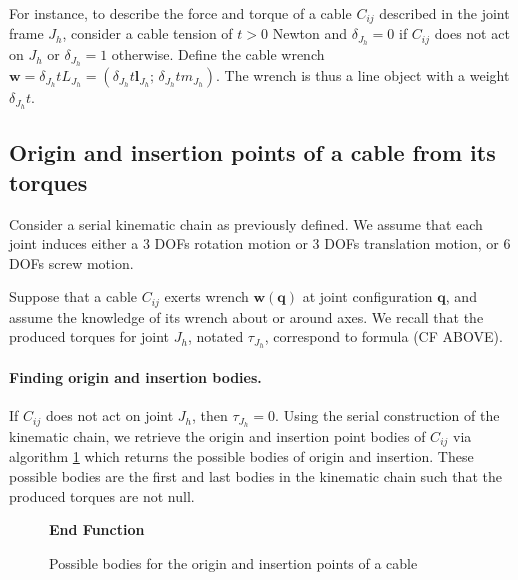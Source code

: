For instance, to describe the force and torque of a cable $C_{ij}$ described in the joint frame $J_h$, consider a cable tension of $t>0$ Newton and $\delta_{J_h} = 0$ if $C_{ij}$ does not act on $J_h$ or $\delta_{J_h} = 1$ otherwise.
Define the cable wrench $\mathbf{w} = \delta_{J_h} t L_{J_h} = (\delta_{J_h} t\mathbf{l}_{J_h};\, \delta_{J_h} t m_{J_h})$. The wrench is thus a line object with a weight $\delta_{J_h} t$.

\subsection{Origin and insertion points of a cable from its torques}
Consider a serial kinematic chain as previously defined. We assume that each joint induces either a 3 DOFs rotation motion or 3 DOFs translation motion, or 6 DOFs screw motion.

Suppose that a cable $C_{ij}$ exerts wrench $\mathbf{w}(\mathbf{q})$ at joint configuration $\mathbf{q}$, and assume the knowledge of its wrench about or around axes. We recall that the produced torques for joint $J_h$, notated $\tau_{J_h}$, correspond to formula (CF ABOVE).

\paragraph*{Finding origin and insertion bodies.}
If $C_{ij}$ does not act on joint $J_h$, then $\tau_{J_h} = 0$. Using the serial construction of the kinematic chain, we retrieve the origin and insertion point bodies of $C_{ij}$ via algorithm \ref{alg:find_bodies_origin_insertion} which returns the possible bodies of origin and insertion. These possible bodies are the first and last bodies in the kinematic chain such that the produced torques are not null. 
\begin{figure}[!ht]
    \centering
    \begin{minipage}{1.0\linewidth}
        \begin{algorithm}[H]
            \SetAlgoLined
            
            \textbf{End Function}
            \caption{Possible bodies for the origin and insertion points of a cable}
            \label{alg:find_bodies_origin_insertion}
        \end{algorithm}
    \end{minipage}
\end{figure}

